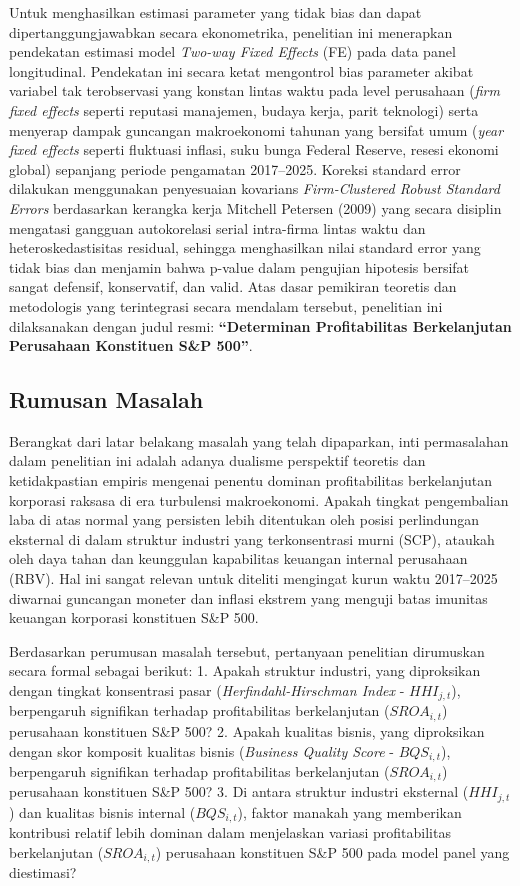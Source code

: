 \documentclass[12pt,a4paper]{article}
\begin{document}
Untuk menghasilkan estimasi parameter yang tidak bias dan dapat
dipertanggungjawabkan secara ekonometrika, penelitian ini menerapkan
pendekatan estimasi model \emph{Two-way Fixed Effects} (FE) pada data
panel longitudinal. Pendekatan ini secara ketat mengontrol bias
parameter akibat variabel tak terobservasi yang konstan lintas waktu
pada level perusahaan (\emph{firm fixed effects} seperti reputasi
manajemen, budaya kerja, parit teknologi) serta menyerap dampak
guncangan makroekonomi tahunan yang bersifat umum (\emph{year fixed
effects} seperti fluktuasi inflasi, suku bunga Federal Reserve, resesi
ekonomi global) sepanjang periode pengamatan 2017--2025. Koreksi
standard error dilakukan menggunakan penyesuaian kovarians
\emph{Firm-Clustered Robust Standard Errors} berdasarkan kerangka kerja
Mitchell Petersen (2009) yang secara disiplin mengatasi gangguan
autokorelasi serial intra-firma lintas waktu dan heteroskedastisitas
residual, sehingga menghasilkan nilai standard error yang tidak bias dan
menjamin bahwa p-value dalam pengujian hipotesis bersifat sangat
defensif, konservatif, dan valid. Atas dasar pemikiran teoretis dan
metodologis yang terintegrasi secara mendalam tersebut, penelitian ini
dilaksanakan dengan judul resmi: \textbf{``Determinan Profitabilitas
Berkelanjutan Perusahaan Konstituen S\&P 500''}.

\subsection{Rumusan Masalah}\label{rumusan-masalah}

Berangkat dari latar belakang masalah yang telah dipaparkan, inti
permasalahan dalam penelitian ini adalah adanya dualisme perspektif
teoretis dan ketidakpastian empiris mengenai penentu dominan
profitabilitas berkelanjutan korporasi raksasa di era turbulensi
makroekonomi. Apakah tingkat pengembalian laba di atas normal yang
persisten lebih ditentukan oleh posisi perlindungan eksternal di dalam
struktur industri yang terkonsentrasi murni (SCP), ataukah oleh daya
tahan dan keunggulan kapabilitas keuangan internal perusahaan (RBV). Hal
ini sangat relevan untuk diteliti mengingat kurun waktu 2017--2025
diwarnai guncangan moneter dan inflasi ekstrem yang menguji batas
imunitas keuangan korporasi konstituen S\&P 500.

Berdasarkan perumusan masalah tersebut, pertanyaan penelitian dirumuskan
secara formal sebagai berikut: 1. Apakah struktur industri, yang
diproksikan dengan tingkat konsentrasi pasar (\emph{Herfindahl-Hirschman
Index} - \(HHI_{j,t}\)), berpengaruh signifikan terhadap profitabilitas
berkelanjutan (\(SROA_{i,t}\)) perusahaan konstituen S\&P 500? 2. Apakah
kualitas bisnis, yang diproksikan dengan skor komposit kualitas bisnis
(\emph{Business Quality Score} - \(BQS_{i,t}\)), berpengaruh signifikan
terhadap profitabilitas berkelanjutan (\(SROA_{i,t}\)) perusahaan
konstituen S\&P 500? 3. Di antara struktur industri eksternal
(\(HHI_{j,t}\)) dan kualitas bisnis internal (\(BQS_{i,t}\)), faktor
manakah yang memberikan kontribusi relatif lebih dominan dalam
menjelaskan variasi profitabilitas berkelanjutan (\(SROA_{i,t}\))
perusahaan konstituen S\&P 500 pada model panel yang diestimasi?
\end{document}
